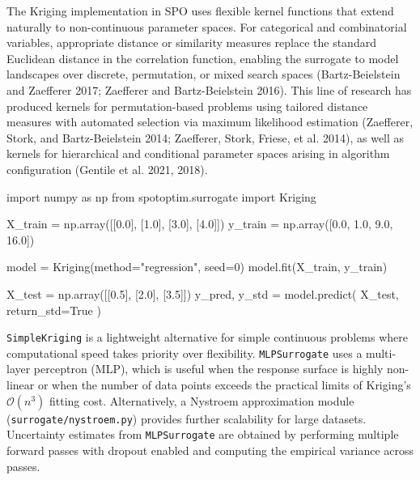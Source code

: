 \documentclass[
  twocolumn]{article}
\newenvironment{Shaded}{\begin{snugshade}}{\end{snugshade}}
\newcommand{\DecValTok}[1]{\textcolor[rgb]{0.68,0.00,0.00}{#1}}
\newcommand{\FloatTok}[1]{\textcolor[rgb]{0.68,0.00,0.00}{#1}}
\newcommand{\ImportTok}[1]{\textcolor[rgb]{0.00,0.46,0.62}{#1}}
\newcommand{\NormalTok}[1]{\textcolor[rgb]{0.00,0.23,0.31}{#1}}
\newcommand{\OperatorTok}[1]{\textcolor[rgb]{0.37,0.37,0.37}{#1}}
\newcommand{\StringTok}[1]{\textcolor[rgb]{0.13,0.47,0.30}{#1}}
\newcommand{\VariableTok}[1]{\textcolor[rgb]{0.07,0.07,0.07}{#1}}
\begin{document}
The Kriging implementation in SPO uses flexible kernel functions that
extend naturally to non-continuous parameter spaces. For categorical and
combinatorial variables, appropriate distance or similarity measures
replace the standard Euclidean distance in the correlation function,
enabling the surrogate to model landscapes over discrete, permutation,
or mixed search spaces (Bartz-Beielstein and Zaefferer 2017; Zaefferer
and Bartz-Beielstein 2016). This line of research has produced kernels
for permutation-based problems using tailored distance measures with
automated selection via maximum likelihood estimation (Zaefferer, Stork,
and Bartz-Beielstein 2014; Zaefferer, Stork, Friese, et al. 2014), as
well as kernels for hierarchical and conditional parameter spaces
arising in algorithm configuration (Gentile et al. 2021, 2018).

\begin{Shaded}
\begin{Highlighting}[]
\ImportTok{import}\NormalTok{ numpy }\ImportTok{as}\NormalTok{ np}
\ImportTok{from}\NormalTok{ spotoptim.surrogate }\ImportTok{import}\NormalTok{ Kriging}

\NormalTok{X\_train }\OperatorTok{=}\NormalTok{ np.array([[}\FloatTok{0.0}\NormalTok{], [}\FloatTok{1.0}\NormalTok{], [}\FloatTok{3.0}\NormalTok{], [}\FloatTok{4.0}\NormalTok{]])}
\NormalTok{y\_train }\OperatorTok{=}\NormalTok{ np.array([}\FloatTok{0.0}\NormalTok{, }\FloatTok{1.0}\NormalTok{, }\FloatTok{9.0}\NormalTok{, }\FloatTok{16.0}\NormalTok{])}

\NormalTok{model }\OperatorTok{=}\NormalTok{ Kriging(method}\OperatorTok{=}\StringTok{"regression"}\NormalTok{, seed}\OperatorTok{=}\DecValTok{0}\NormalTok{)}
\NormalTok{model.fit(X\_train, y\_train)}

\NormalTok{X\_test }\OperatorTok{=}\NormalTok{ np.array([[}\FloatTok{0.5}\NormalTok{], [}\FloatTok{2.0}\NormalTok{], [}\FloatTok{3.5}\NormalTok{]])}
\NormalTok{y\_pred, y\_std }\OperatorTok{=}\NormalTok{ model.predict(}
\NormalTok{    X\_test, return\_std}\OperatorTok{=}\VariableTok{True}
\NormalTok{)}
\end{Highlighting}
\end{Shaded}

\texttt{SimpleKriging} is a lightweight alternative for simple
continuous problems where computational speed takes priority over
flexibility. \texttt{MLPSurrogate} uses a multi-layer perceptron (MLP),
which is useful when the response surface is highly non-linear or when
the number of data points exceeds the practical limits of Kriging's
\(\mathcal{O}(n^3)\) fitting cost. Alternatively, a Nystroem
approximation module (\texttt{surrogate/nystroem.py}) provides further
scalability for large datasets. Uncertainty estimates from
\texttt{MLPSurrogate} are obtained by performing multiple forward passes
with dropout enabled and computing the empirical variance across passes.
\end{document}
